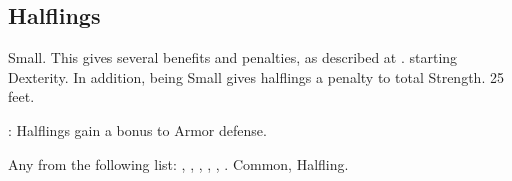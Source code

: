 \subsection{Halflings}
 Small. This gives several benefits and penalties, as described at .
  starting Dexterity. In addition, being Small gives halflings a  penalty to total Strength.
 25 feet.
\begin{itemize}
    : Halflings gain a  bonus to Armor defense.
\end{itemize}
 Any from the following list: , , , , , .
 Common, Halfling.
